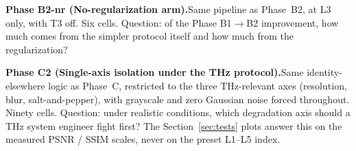 \textbf{Phase B2-nr (No-regularization arm).}\quad Same pipeline as
Phase~B2, at L3 only, with T3 off. Six cells. Question: of the Phase
B1$\rightarrow$B2 improvement, how much comes from the simpler protocol
itself and how much from the regularization?

\textbf{Phase C2 (Single-axis isolation under the THz protocol).}\quad Same
identity-elsewhere logic as Phase~C, restricted to the three THz-relevant
axes (resolution, blur, salt-and-pepper), with grayscale and zero Gaussian
noise forced throughout. Ninety cells. Question: under realistic conditions,
which degradation axis should a THz system engineer fight first? The
Section~\ref{sec:tests} plots answer this on the measured PSNR / SSIM scales,
never on the preset L1--L5 index.


